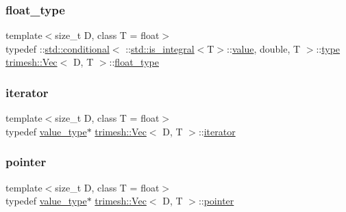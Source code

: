 \mbox{\label{classtrimesh_1_1Vec_a2593716457a143008832235a3e4a9155}} 
\subsubsection{\texorpdfstring{float\+\_\+type}{float\_type}}
{\footnotesize\ttfamily template$<$size\+\_\+t D, class T = float$>$ \\
typedef \+::\hyperlink{structstd_1_1conditional}{std\+::conditional}$<$ \+::\hyperlink{structstd_1_1is__integral}{std\+::is\+\_\+integral}$<$T$>$\+::\hyperlink{namespacetrimesh_ab10cc1052c9d1d1376d92211b6ca27dd}{value}, double, T $>$\+::\hyperlink{namespacetrimesh_aa726c5bf9cff74a26269e8d258ae9e3d}{type} \hyperlink{classtrimesh_1_1Vec}{trimesh\+::\+Vec}$<$ D, T $>$\+::\hyperlink{classtrimesh_1_1Vec_a2593716457a143008832235a3e4a9155}{float\+\_\+type}}

\mbox{\label{classtrimesh_1_1Vec_ae21cfb5c00b53dc906ddc4f939ca8d22}} 
\subsubsection{\texorpdfstring{iterator}{iterator}}
{\footnotesize\ttfamily template$<$size\+\_\+t D, class T = float$>$ \\
typedef \hyperlink{classtrimesh_1_1Vec_a10a59253996e42d67c713f37592669df}{value\+\_\+type}$\ast$ \hyperlink{classtrimesh_1_1Vec}{trimesh\+::\+Vec}$<$ D, T $>$\+::\hyperlink{classtrimesh_1_1Vec_ae21cfb5c00b53dc906ddc4f939ca8d22}{iterator}}

\mbox{\label{classtrimesh_1_1Vec_aa424b6ab52371a9b0f99f422b1aa1d26}} 
\subsubsection{\texorpdfstring{pointer}{pointer}}
{\footnotesize\ttfamily template$<$size\+\_\+t D, class T = float$>$ \\
typedef \hyperlink{classtrimesh_1_1Vec_a10a59253996e42d67c713f37592669df}{value\+\_\+type}$\ast$ \hyperlink{classtrimesh_1_1Vec}{trimesh\+::\+Vec}$<$ D, T $>$\+::\hyperlink{classtrimesh_1_1Vec_aa424b6ab52371a9b0f99f422b1aa1d26}{pointer}}

